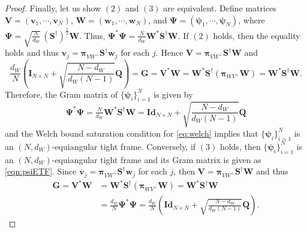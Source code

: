\documentclass[10pt,a4paper]{amsart}
\newcommand{\bpi}{{\boldsymbol{\pi}}}
\begin{document}
\begin{proof}
Finally, let us show $(2)$ and $(3)$ are equivalent. Define matrices $\mathbf{V}=(\mathbf{v}_1, \cdots, \mathbf{v}_N)$, $\mathbf{W} = (\mathbf{w}_1, \cdots, \mathbf{w}_N)$, and $\boldsymbol{\Psi} = (\boldsymbol{\psi}_1, \cdots, \boldsymbol{\psi}_N)$, where $\boldsymbol{\Psi} = \sqrt{\tfrac{N}{d_W}} \, (\mathbf{S}^\dagger)^{\frac{1}{2}} \mathbf{W}$. Thus, $\boldsymbol{\Psi}^* \boldsymbol{\Psi} = \tfrac{N}{d_W}  \mathbf{W}^* \mathbf{S}^\dagger \mathbf{W}$. If $(2)$ holds, then the equality holds and thus $\mathbf{v}_j = \bpi_{VW^\perp} \mathbf{S}^\dagger \mathbf{w}_j$ for each $j$. Hence  $\mathbf{V} = \bpi_{V W^\perp} \mathbf{S}^{\dagger}\mathbf{W} $ and
\begin{equation*}
    \frac{d_W}{N} \left(\mathbf{I}_{N \times N} + \sqrt{\frac{N-d_W}{d_W(N-1)}}\mathbf{Q}\right) = \mathbf{G} = \mathbf{V}^*\mathbf{W}  = \mathbf{W}^* \mathbf{S}^{\dagger} (\bpi_{W V^\perp}\mathbf{W})  = \mathbf{W}^* \mathbf{S}^{\dagger}\mathbf{W}.
    \end{equation*}
Therefore, the Gram matrix of $\{\boldsymbol{\psi}_i\}_{i=1}^N $ is given by
\begin{equation}\label{eqn:psiETF}
    \boldsymbol{\Psi}^* \boldsymbol{\Psi} = \tfrac{N}{d_W}  \mathbf{W}^* \mathbf{S}^\dagger \mathbf{W} = \mathbf{Id}_{N \times N} + \sqrt{\frac{N-d_W}{d_W(N-1)}}\mathbf{Q}
\end{equation}
and the Welch bound saturation condition for \eqref{eq:welch} implies that $\{\boldsymbol{\psi}_i\}_{i=1}^N$ is an $(N,d_W)$-equiangular tight frame. 
Conversely, if $(3)$ holds, then $\{\boldsymbol{\psi}_i\}_{i=1}^N$ is an $(N,d_W)$-equiangular tight frame and its Gram matrix is given as \cref{eqn:psiETF}. Since $\mathbf{v}_j = \bpi_{VW^\perp} \mathbf{S}^\dagger \mathbf{w}_j$ for each $j$, then  $\mathbf{V} = \bpi_{V W^\perp} \mathbf{S}^{\dagger}\mathbf{W} $ and thus
\begin{equation*}
\begin{split}
     \mathbf{G} = \mathbf{V}^*\mathbf{W} & =  \mathbf{W}^*  \mathbf{S}^{\dagger} (\bpi_{W V^\perp}\mathbf{W}) = \mathbf{W}^* \mathbf{S}^{\dagger}\mathbf{W} \\
     & = \frac{d_W}{N} \boldsymbol{\Psi}^* \boldsymbol{\Psi} =  \frac{d_W}{N} \left(\mathbf{Id}_{N \times N} + \sqrt{\frac{N-d_W}{d_W(N-1)}}\mathbf{Q} \right).
\end{split}
\end{equation*}
\end{proof}
\end{document}
